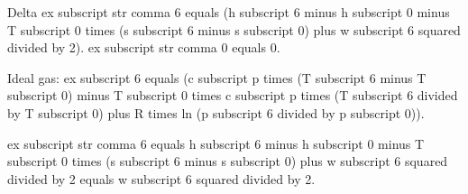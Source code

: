 Delta ex subscript str comma 6 equals (h subscript 6 minus h subscript 0 minus T subscript 0 times (s subscript 6 minus s subscript 0) plus w subscript 6 squared divided by 2).  
ex subscript str comma 0 equals 0.  

Ideal gas:  
ex subscript 6 equals (c subscript p times (T subscript 6 minus T subscript 0) minus T subscript 0 times c subscript p times (T subscript 6 divided by T subscript 0) plus R times ln (p subscript 6 divided by p subscript 0)).  

ex subscript str comma 6 equals h subscript 6 minus h subscript 0 minus T subscript 0 times (s subscript 6 minus s subscript 0) plus w subscript 6 squared divided by 2 equals w subscript 6 squared divided by 2.